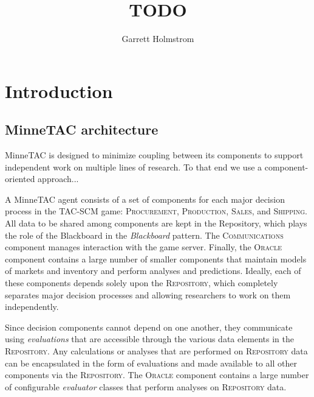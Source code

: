 \documentclass{article}
\begin{document}
\title{TODO}
\author[UMN]{Garrett Holmstrom}

\address[UMN]{Dept. of Computer Science and Engineering,
    University of Minnesota, 4-192 EE/CS Bldg., 200 Union St SE, Minneapolis,
    MN 55455, USA.}

\maketitle

\begin{abstract}

\end{abstract}

\section{Introduction}


\subsection{MinneTAC architecture}

MinneTAC is designed to minimize coupling between its components to support independent work on multiple lines of research.  To that end we use a component-oriented approach...

A MinneTAC agent consists of a set of components for each major decision process in the TAC-SCM game:  \textsc{Procurement}, \textsc{Production}, \textsc{Sales}, and \textsc{Shipping}.  All data to be shared among components are kept in the Repository, which plays the role of the Blackboard in the \emph{Blackboard} pattern\cite{Busch96}.  The \textsc{Communications} component manages interaction with the game server.  Finally, the \textsc{Oracle} component contains a large number of smaller components that maintain models of markets and inventory and perform analyses and predictions.  Ideally, each of these components depends solely upon the \textsc{Repository}, which completely separates major decision processes and allowing researchers to work on them independently.


Since decision components cannot depend on one another, they communicate using \emph{evaluations} that are accessible through the various data elements in the \textsc{Repository}.  Any calculations or analyses that are performed on \textsc{Repository} data can be encapsulated in the form of evaluations and made available to all other components via the \textsc{Repository}.  The \textsc{Oracle} component contains a large number of configurable \emph{evaluator} classes that perform analyses on \textsc{Repository} data.
\end{document}
